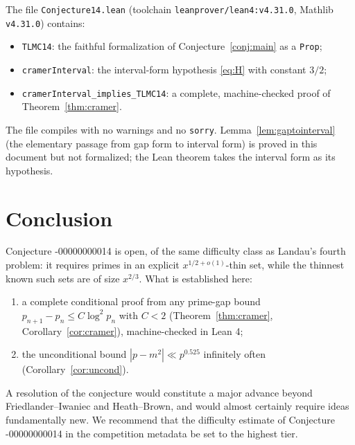 \documentclass[11pt]{article}
\theoremstyle{definition}
\theoremstyle{remark}
\newcommand{\TLMC}{\mathrm{TLMC}}
\begin{document}
The file \texttt{Conjecture14.lean} (toolchain \texttt{leanprover/lean4:v4.31.0}, Mathlib \texttt{v4.31.0}) contains:
\begin{itemize}
\item \texttt{TLMC14}: the faithful formalization of Conjecture~\ref{conj:main} as a \texttt{Prop};
\item \texttt{cramerInterval}: the interval-form hypothesis \eqref{eq:H} with constant $3/2$;
\item \texttt{cramerInterval\_implies\_TLMC14}: a complete, machine-checked proof of Theorem~\ref{thm:cramer}.
\end{itemize}
The file compiles with no warnings and no \texttt{sorry}. Lemma~\ref{lem:gaptointerval} (the elementary passage from gap form to interval form) is proved in this document but not formalized; the Lean theorem takes the interval form as its hypothesis.

\section{Conclusion}

Conjecture \TLMC-00000000014 is open, of the same difficulty class as Landau's fourth problem: it requires primes in an explicit $x^{1/2+o(1)}$-thin set, while the thinnest known such sets are of size $x^{2/3}$. What is established here:
\begin{enumerate}
\item a complete conditional proof from any prime-gap bound $p_{n+1}-p_n \le C\log^2 p_n$ with $C < 2$ (Theorem~\ref{thm:cramer}, Corollary~\ref{cor:cramer}), machine-checked in Lean 4;
\item the unconditional bound $|p - m^2| \ll p^{0.525}$ infinitely often (Corollary~\ref{cor:uncond}).
\end{enumerate}
A resolution of the conjecture would constitute a major advance beyond Friedlander--Iwaniec and Heath--Brown, and would almost certainly require ideas fundamentally new. We recommend that the difficulty estimate of Conjecture \TLMC-00000000014 in the competition metadata be set to the highest tier.
\end{document}
